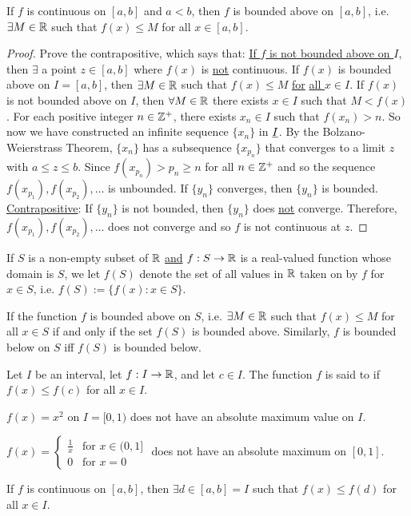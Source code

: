 \documentclass[]{article}
\begin{document}
\begin{theorem}
	 If $f$ is continuous on $[a,b]$ and $a<b$, then $f$ is bounded above on $[a,b]$, i.e. \ul{$\exists M\in\mathbb{R}$} such that $f(x)\leq M$ for all $x\in[a,b]$.
\end{theorem}
\begin{proof}
	Prove the contrapositive, which says that: \ul{If $f$ is \ul{not} bounded above on $I$}, then $\exists$ a point $z\in[a,b]$ where $f(x)$ is \ul{not} continuous.
	If $f(x)$ is bounded above on $I=[a,b]$, then $\exists M\in \mathbb{R}$ such that $f(x)\leq M$ \ul{for} \ul{all $x\in I$}. If $f(x)$ is not bounded above on $I$, then $\forall M\in\mathbb{R}$ there exists $x\in I$ such that $M<f(x)$.
	For each positive integer $n\in\mathbb{Z}^+$, there exists $x_n\in I$ such that \ul{$f(x_n)>n$}. So now we have constructed an infinite sequence \ul{$\{x_n\}$} in $\underline{I}$.
	By the Bolzano-Weierstrass Theorem, $\{x_n\}$ has a subsequence $\{x_{p_n}\}$ that converges to a limit $z$ with $a\leq z\leq b$.
	Since \ul{$f(x_{p_n}) > p_n \geq n$} for all $n\in\mathbb{Z}^+$ and so the sequence $f(x_{p_1}),f(x_{p_2}),\dots$ is unbounded.
	If $\{y_n\}$ converges, then $\{y_n\}$ is bounded. \ul{Contrapositive}: If $\{y_n\}$ is not bounded, then $\{y_n\}$ does \ul{not} converge.
	Therefore, $f(x_{p_1}),f(x_{p_2}),\dots$ does not converge and so $f$ is not continuous at $z$.
\end{proof}
\begin{definition}
	If $S$ is a non-empty subset of $\mathbb{R}$ \ul{and} \ul{$f:S\rightarrow \mathbb{R}$} is a real-valued function whose domain is $S$, we let $f(S)$ denote the set of all values in $\mathbb{R}$ taken on by $f$ for $x\in S$, i.e. $f(S) := \{f(x):x\in S\}$.
\end{definition}
\begin{note}
	If the function $f$ is bounded above on $S$, i.e. $\exists M\in \mathbb{R}$ such that $f(x)\leq M$ for all $x\in S$ if and only if the set $f(S)$ is bounded above. Similarly, $f$ is bounded below on $S$ iff $f(S)$ is bounded below.
\end{note}
\begin{definition}
	Let $I$ be an interval, let $f:I\rightarrow \mathbb{R}$, and let $c\in I$. The function $f$ is said to  if $f(x) \leq f(c)$ for all $x\in I$.
\end{definition}
\begin{example}
	$f(x) = x^2$ on $I = [0,1)$ does not have an absolute maximum value on $I$.
\end{example}
\begin{example}
	$f(x) = \begin{cases} \frac{1}{x} & \text{for } x\in(0,1] \\ 0 & \text{for } x = 0 \end{cases}$ does not have an absolute maximum on $[0,1]$.
\end{example}
\begin{theorem}
	 If $f$ is continuous on $[a,b]$, then $\exists d\in[a,b]=I$ such that $f(x) \leq f(d)$ for all $x\in I$.
\end{theorem}
\end{document}
